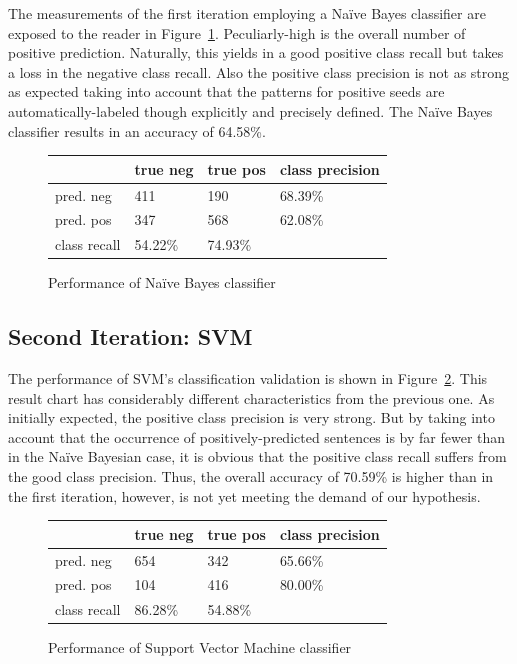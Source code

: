 \documentclass[11pt,titlepage,oneside,openany]{book}
\begin{document}
The measurements of the first iteration employing a Na\"{i}ve Bayes classifier are exposed to the reader in Figure~\ref{fig.nb}. Peculiarly-high is the overall number of positive prediction. Naturally, this yields in a good positive class recall but takes a loss in the negative class recall. Also the positive class precision is not as strong as expected taking into account that the patterns for positive seeds are automatically-labeled though explicitly and precisely defined. The Na\"{i}ve Bayes classifier results in an accuracy of 64.58\%.

\begin{figure} [h!]
\centering
\begin{tabular}{ | l | l | l | l | }
\hline
	 & true neg & true pos & class precision \\ \hline
	pred. neg & 411 & 190 & 68.39\% \\ \hline
	pred. pos & 347 & 568 & 62.08\% \\ \hline
	class recall & 54.22\% & 74.93\% &  \\ \hline
\end{tabular}
\caption{Performance of Na\"{i}ve Bayes classifier}
\label{fig.nb}
\end{figure}


\subsection{Second Iteration: SVM}
\label{sec:svm}

The performance of SVM's classification validation is shown in Figure~\ref{fig.svm}. This result chart has considerably different characteristics from the previous one. As initially expected, the positive class precision is very strong. But by taking into account that the occurrence of positively-predicted sentences is by far fewer than in the Na\"{i}ve Bayesian case, it is obvious that the positive class recall suffers from the good class precision. Thus, the overall accuracy of 70.59\% is higher than in the first iteration, however, is not yet meeting the demand of our hypothesis.

\begin{figure} [h!]
\centering
\begin{tabular}{ | l | l | l | l | }
\hline
	 & true neg & true pos & class precision \\ \hline
	pred. neg & 654 & 342 & 65.66\% \\ \hline
	pred. pos & 104 & 416 & 80.00\% \\ \hline
	class recall & 86.28\% & 54.88\% &  \\ \hline
\end{tabular}
\caption{Performance of Support Vector Machine classifier}
\label{fig.svm}
\end{figure}
\end{document}
